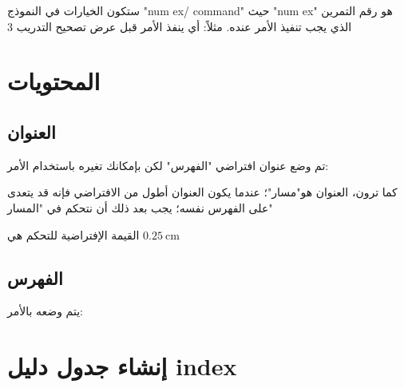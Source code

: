\documentclass[12pt,a4paper]{mathbook_arabic}
\newcommand\ee{\textenglish}
\begin{document}
 ستكون الخيارات في النموذج
\ee{"num ex/ command"}
 حيث
 \ee{"num ex"}
 هو رقم التمرين الذي يجب تنفيذ الأمر عنده. مثلاً:
 \LR{\begin{lstlisting}
 \AfficheCorriges[3/\columnbreak]
 %Executes the command before displaying the correction for Exercise 3
\end{lstlisting}}
 أي ينفذ الأمر قبل عرض تصحيح التدريب 3
 
\corrstart

\begin{multicols}{2}
\AfficheCorriges[4/{\columnbreak}]
\end{multicols}

 
%
 
 \newpage
 \pagecolor{white}
 
 \section{المحتويات}
 \subsection{العنوان}
 تم وضع عنوان افتراضي 
 "الفهرس"
لكن بإمكانك تغيره باستخدام الأمر:
  \LR{\begin{lstlisting}
% For exemple :
 \addto\captionsarabic{\renewcommand{\contentsname}{<arabic title>}}
\end{lstlisting}}

  كما ترون، العنوان هو"مسار"؛ عندما يكون العنوان أطول من الافتراضي فإنه قد يتعدى على الفهرس نفسه؛ يجب بعد ذلك أن نتحكم في "المسار"
 
  \LR{\begin{lstlisting}
 \setlength{\controltoctitle}{0.1cm} % for exemple
\end{lstlisting}}
القيمة الإفتراضية للتحكم هي $0.25 \ \text{cm}$
 
 
 \subsection{الفهرس}
 يتم وضعه بالأمر:
  
   \LR{\begin{lstlisting}
\tableofcontents
\end{lstlisting}}
 
 \section{ إنشاء جدول دليل 
\ee{index} 
 }
\end{document}
